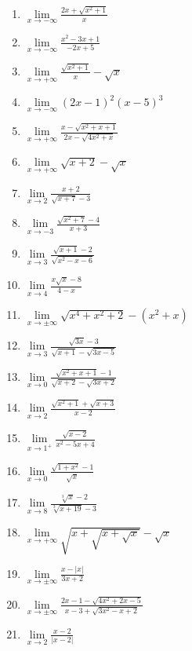 \documentclass[12pt,a4paper]{article}
\begin{document}
\begin{multicols}{3}
\begin{enumerate}[align=left]
    \item $\displaystyle \lim\limits_{x \to -\infty} \frac{2x + \sqrt{x^2 + 1}}{x}$
    \item $\displaystyle  \lim\limits_{x \to -\infty} \frac{x^2 - 3x + 1}{-2x+5}$
    \item $\displaystyle \lim\limits_{x \to +\infty} \frac{\sqrt{x^2 + 1}}{x} - \sqrt{x}$
    \item $\displaystyle \lim\limits_{x \to -\infty} (2x - 1)^2(x - 5)^3$
    \item $\displaystyle \lim\limits_{x \to +\infty} \frac{x - \sqrt{x^2 + x + 1}}{2x - \sqrt{4x^2 + x}}$
    \item $\displaystyle \lim\limits_{x \to +\infty} \sqrt{x + 2} - \sqrt{x}$
    \item $\displaystyle \lim\limits_{x \to 2} \frac{x + 2}{\sqrt{x + 7} - 3}$
    \item $\displaystyle \lim\limits_{x \to -3} \frac{\sqrt{x^2 + 7} - 4}{x + 3}$
    \item $\displaystyle \lim\limits_{x \to 3} \frac{\sqrt{x + 1} - 2}{\sqrt{x^2 - x - 6}}$
    \item $\displaystyle \lim\limits_{x \to 4} \frac{x\sqrt{x} - 8}{4 - x}$
    \item $\displaystyle \lim\limits_{x \to \pm\infty} \sqrt{x^4 + x^2 + 2} - (x^2 + x)$
    \item $\displaystyle \lim\limits_{x \to 3} \frac{\sqrt{3x} - 3}{\sqrt{x + 1} - \sqrt{3x - 5}}$
    \item $\displaystyle \lim\limits_{x \to 0} \frac{\sqrt{x^2 + x + 1} - 1}{\sqrt{x + 2} - \sqrt{3x + 2}}$
    \item $\displaystyle \lim\limits_{x \to 2} \frac{\sqrt{x^2 + 1} + \sqrt{x + 3}}{x - 2}$
    \item $\displaystyle \lim\limits_{x \to 1^+} \frac{\sqrt{x - 2}}{x^2 - 5x + 4}$
    \item $\displaystyle \lim\limits_{x \to 0} \frac{\sqrt{1 + x^2} - 1}{\sqrt{x}}$
    \item $\displaystyle \lim\limits_{x \to 8} \frac{\sqrt[3]{x}-2}{\sqrt[3]{x + 19} - 3}$
    \item $\displaystyle \lim\limits_{x \to +\infty} \sqrt{x + \sqrt{x + \sqrt{x}}} - \sqrt{x}$
    \item $\displaystyle \lim\limits_{x \to \pm\infty} \frac{x - |x|}{3x + 2}$
    \item $\displaystyle \lim\limits_{x \to \pm\infty} \frac{2x - 1 - \sqrt{4x^2 + 2x - 5}}{x - 3 + \sqrt{3x^{2} - x + 2}}$
    \item $\displaystyle \lim\limits_{x \to 2} \frac{x - 2}{|x - 2|}$

\end{enumerate}
\end{multicols}
\end{document}
